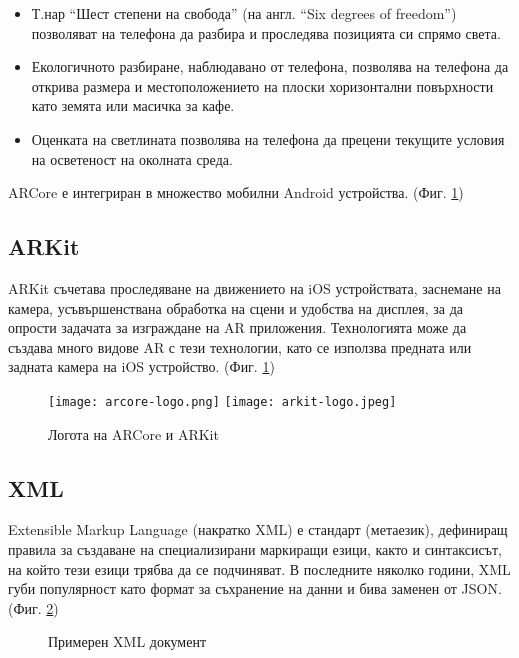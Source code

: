 \begin{itemize}
    \item Т.нар ``Шест степени на свобода'' (на англ. ``Six degrees of freedom'') позволяват на телефона да разбира и проследява позицията си спрямо света.
    \item Екологичното разбиране, наблюдавано от телефона, позволява на телефона да открива размера и местоположението на плоски хоризонтални повърхности като земята или масичка за кафе.
    \item Оценката на светлината позволява на телефона да прецени текущите условия на осветеност на околната среда.
\end{itemize}

ARCore е интегриран в множество мобилни Android устройства. (Фиг. \ref{fig:arcore-arkit-logos})

\subsection{ARKit}
ARKit съчетава проследяване на движението на iOS устройствата, заснемане на камера, усъвършенствана обработка на сцени и удобства на дисплея, за да опрости задачата за изграждане на AR приложения. Технологията може да създава много видове AR с тези технологии, като се използва предната или задната камера на iOS устройство. (Фиг. \ref{fig:arcore-arkit-logos})

\begin{figure}[H]
    \texttt{[image: arcore-logo.png]}
    \texttt{[image: arkit-logo.jpeg]}
    \centering
    \caption{Логота на ARCore и ARKit}
    \label{fig:arcore-arkit-logos}
\end{figure}

\subsection{XML}
Extensible Markup Language (накратко XML) е стандарт (метаезик), дефиниращ правила за създаване на специализирани маркиращи езици, както и синтаксисът, на който тези езици трябва да се подчиняват. В последните няколко години, XML губи популярност като формат за съхранение на данни и бива заменен от JSON. (Фиг. \ref{fig:example-xml})

\begin{figure}[H]
    
    \centering
    \caption{Примерен XML документ}
    \label{fig:example-xml}
\end{figure}

